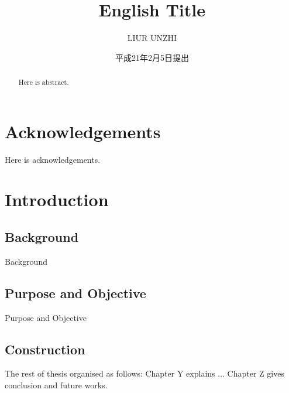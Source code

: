 \documentclass[12pt,epsf,dvipdfmx]{report}
\begin{document}
\title{English Title}
\author{LIUR UNZHI}
\date{平成21年2月5日提出}
\maketitle


\begin{abstract}
Here is abstract.
\end{abstract}


\chapter*{Acknowledgements}
\setcounter{page}{2}
\noindent
Here is acknowledgements.

\tableofcontents
\listoffigures
{}
\listoftables
{}


\chapter{Introduction}
\setcounter{page}{1}


\section{Background}

Background

\section{Purpose and Objective}

Purpose and Objective

\section{Construction}
The rest of thesis organised as follows:
Chapter Y explains ... 
Chapter Z gives conclusion and future works.
\end{document}
